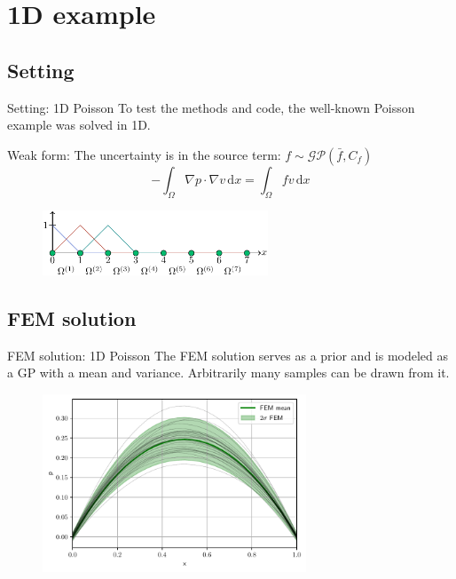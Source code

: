 \documentclass[fleqn,11pt,aspectratio=43]{beamer}
\begin{document}
\section{1D example}
\subsection{Setting}

\begin{frame}{Setting: 1D Poisson}
To test the methods and code, the well-known Poisson example was solved in 1D.
\begin{block}{Weak form:}
The uncertainty is in the source term: $f \sim \mathcal{GP}(\bar{f}, C_f)$
\begin{equation}
-\int_{\Omega} \nabla p \cdot \nabla v \,\mathrm{d}x = \int_{\Omega} fv \,\mathrm{d}x
\end{equation}
\end{block}
      	\begin{figure}[h]
		\begin{center}
		\includegraphics[width=0.6\textwidth]{1dDomain}
		\end{center}
		\end{figure}

\end{frame}


\subsection{FEM solution}
\begin{frame}{FEM solution: 1D Poisson}
The FEM solution serves as a prior and is modeled as a GP with a mean and variance. Arbitrarily many samples can be drawn from it.
      	\begin{figure}[h]
		\begin{center}
		\includegraphics[width=0.7\textwidth]{1DFEMprior}
		\end{center}
		\end{figure}

\end{frame}
\end{document}
